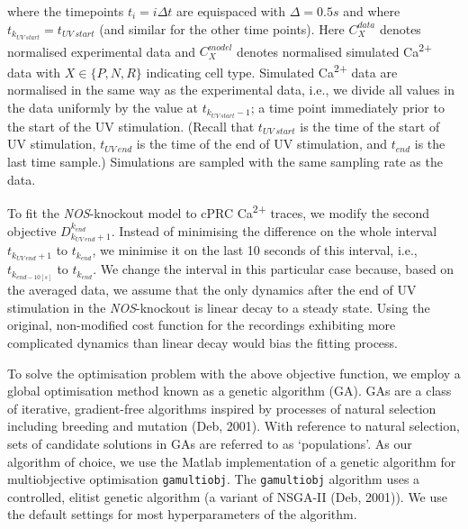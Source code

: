 \documentclass[
  11pt,
  letterpaper,
  DIV=11,
  numbers=noendperiod]{scrartcl}
\begin{document}
where the timepoints \(t_i = i \Delta t\) are equispaced with
\(\Delta = 0.5s\) and where \(t_{k_{UV\: start}} = t_{UV \: start}\)
(and similar for the other time points). Here \({C}_X^{data}\) denotes
normalised experimental data and \({C}_X^{model}\) denotes normalised
simulated Ca\textsuperscript{2+} data with \(X \in \{ P, N, R\}\)
indicating cell type. Simulated Ca\textsuperscript{2+} data are
normalised in the same way as the experimental data, i.e., we divide all
values in the data uniformly by the value at \(t_{k_{UV\: start}-1}\); a
time point immediately prior to the start of the UV stimulation. (Recall
that \(t_{UV\: start}\) is the time of the start of UV stimulation,
\(t_{UV\: end}\) is the time of the end of UV stimulation, and
\(t_{end}\) is the last time sample.) Simulations are sampled with the
same sampling rate as the data.

To fit the \emph{NOS}-knockout model to cPRC Ca\textsuperscript{2+}
traces, we modify the second objective
\(D_{k_{UV\: end }+1}^{k_{end}}\). Instead of minimising the difference
on the whole interval \(t_{k_{UV\: end }+1}\) to \(t_{k_{end}}\), we
minimise it on the last 10 seconds of this interval, i.e.,
\(t_{k_{end-10[s]}}\) to \(t_{k_{end}}\). We change the interval in this
particular case because, based on the averaged data, we assume that the
only dynamics after the end of UV stimulation in the \emph{NOS}-knockout
is linear decay to a steady state. Using the original, non-modified cost
function for the recordings exhibiting more complicated dynamics than
linear decay would bias the fitting process.

To solve the optimisation problem with the above objective function, we
employ a global optimisation method known as a genetic algorithm (GA).
GAs are a class of iterative, gradient-free algorithms inspired by
processes of natural selection including breeding and mutation (Deb,
2001). With reference to natural selection, sets of candidate solutions
in GAs are referred to as `populations'. As our algorithm of choice, we
use the Matlab implementation of a genetic algorithm for multiobjective
optimisation \texttt{gamultiobj}. The \texttt{gamultiobj} algorithm uses
a controlled, elitist genetic algorithm (a variant of NSGA-II (Deb,
2001)). We use the default settings for most hyperparameters of the
algorithm.
\end{document}
